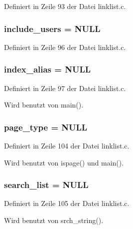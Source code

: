 Definiert in Zeile 93 der Datei linklist.c.
\subsubsection{ {\bf include\_\-users} = NULL}\label{linklist_8c_4301d92f7f72fdda0af03033d967155b}




Definiert in Zeile 96 der Datei linklist.c.
\subsubsection{ {\bf index\_\-alias} = NULL}\label{linklist_8c_a35b4fc28f26c83f77336185f9aa7175}




Definiert in Zeile 97 der Datei linklist.c.

Wird benutzt von main().
\subsubsection{ {\bf page\_\-type} = NULL}\label{linklist_8c_556b3c90c27ba5b38626945734914353}




Definiert in Zeile 104 der Datei linklist.c.

Wird benutzt von ispage() und main().
\subsubsection{ {\bf search\_\-list} = NULL}\label{linklist_8c_d93c06cbf86de996601e602d07da3663}




Definiert in Zeile 105 der Datei linklist.c.

Wird benutzt von srch\_\-string().